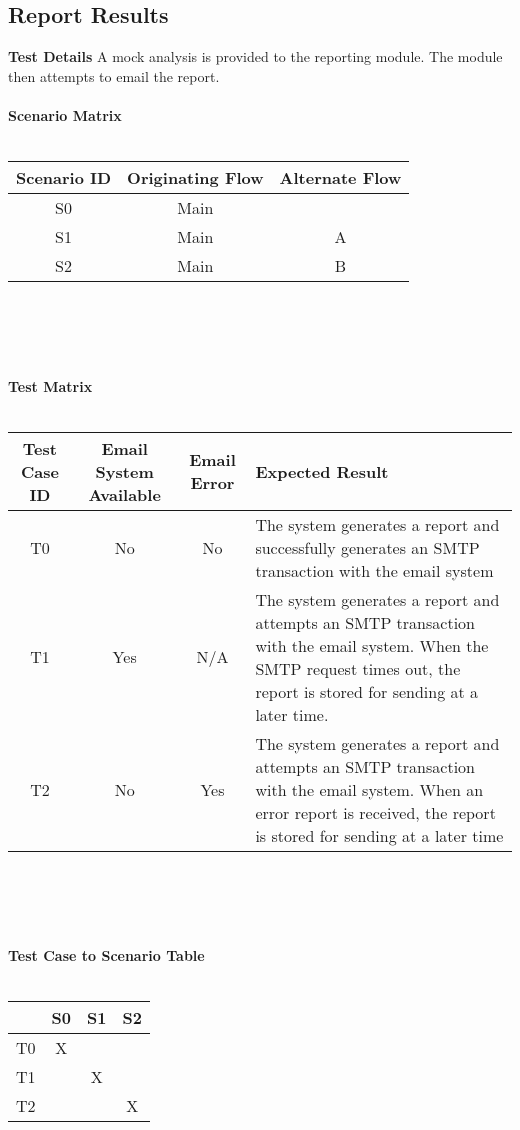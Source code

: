 \subsection{Report Results}
\textbf{Test Details}
A mock analysis is provided to the reporting module.  The module then attempts to email the report.\\\\
\textbf{Scenario Matrix}\\\\
\begin{tabular}{|c|c c|}
	\hline
	Scenario ID & Originating Flow & Alternate Flow \\ \hline \hline
	S0 & Main & \\ \hline
	S1 & Main & A \\ \hline
	S2 & Main & B \\ \hline
\end{tabular}\\\\\\\\
\textbf{Test Matrix}\\\\
\begin{tabularx}{\textwidth}{|c c c X|}
	\hline
	\textbf{Test Case ID} & \textbf{Email System Available} & \textbf{Email Error} & \textbf{Expected Result}  \\ \hline
	T0 & No & No & The system generates a report and successfully generates an SMTP transaction with the email system \\ \hline
	T1 & Yes & N/A & The system generates a report and attempts an SMTP transaction with the email system.  When the SMTP request times out, the report is stored for sending at a later time. \\ \hline
	T2 & No & Yes & The system generates a report and attempts an SMTP transaction with the email system.  When an error report is received, the report is stored for sending at a later time \\ \hline
\end{tabularx}\\\\\\\\
\textbf{Test Case to Scenario Table}\\\\
\begin{tabular}{|r||c|c|c|}
	\hline
	& S0 & S1 & S2 \\ \hline \hline
	T0 & X & & \\ \hline
	T1 & & X & \\ \hline
	T2 & & & X \\ \hline
\end{tabular}

